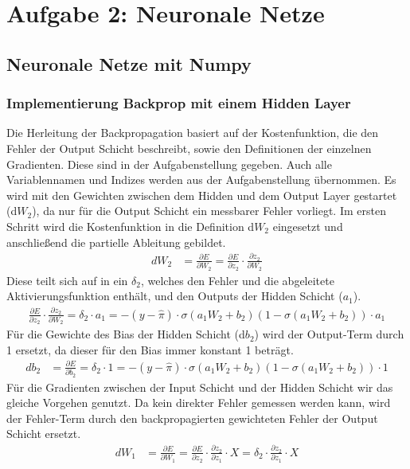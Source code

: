 \section{Aufgabe 2: Neuronale Netze}
\subsection{Neuronale Netze mit Numpy}
\subsubsection{Implementierung Backprop mit einem Hidden Layer}
Die Herleitung der Backpropagation basiert auf der Kostenfunktion, die den Fehler der Output Schicht beschreibt, sowie den Definitionen der einzelnen Gradienten. Diese sind in der Aufgabenstellung gegeben. Auch alle Variablennamen und Indizes werden aus der Aufgabenstellung übernommen. Es wird mit den Gewichten zwischen dem Hidden und dem Output Layer gestartet (d$W_{2}$), da nur für die Output Schicht ein messbarer Fehler vorliegt. Im ersten Schritt wird die Kostenfunktion in die  Definition d$W_{2}$ eingesetzt und anschließend die partielle Ableitung gebildet.
\begin{align*}
dW_{2} &= \frac{\partial E}{\partial W_{2}}
= \frac{\partial E}{\partial z_{2}}\cdot \frac{\partial z_{2}}{\partial W_{2}}
\end{align*}
Diese teilt sich auf in ein $\delta_{2}$, welches den Fehler und die abgeleitete Aktivierungsfunktion enthält, und den Outputs der Hidden Schicht ($a_{1}$).
\begin{align*}
\frac{\partial E}{\partial z_{2}}\cdot \frac{\partial z_{2}}{\partial W_{2}} = \delta_{2} \cdot a_{1}= -(y-\hat{\pi}) \cdot \sigma(a_{1}W_{2}+b_{2})(1-\sigma(a_{1}W_{2}+b_{2}))\cdot a_{1}
\end{align*}
Für die Gewichte des Bias der Hidden Schicht (d$b_{2}$) wird der Output-Term durch 1 ersetzt, da dieser für den Bias immer konstant 1 beträgt.
\begin{align*}
db_{2} &= \frac{\partial E}{\partial b_{2}}
= \delta_{2} \cdot 1 = -(y-\hat{\pi}) \cdot \sigma(a_{1}W_{2}+b_{2})(1-\sigma(a_{1}W_{2}+b_{2})) \cdot 1
\end{align*}
Für die Gradienten zwischen der Input Schicht und der Hidden Schicht wir das gleiche Vorgehen genutzt. Da kein direkter Fehler gemessen werden kann, wird der Fehler-Term durch den backpropagierten gewichteten Fehler der Output Schicht ersetzt.
\begin{align*}
dW_{1} &= \frac{\partial E}{\partial W_{1}}
= \frac{\partial E}{\partial z_{2}}\cdot \frac{\partial z_{2}}{\partial z_{1}} \cdot X = \delta_{2} \cdot \frac{\partial z_{2}}{\partial z_{1}} \cdot X
\end{align*}
